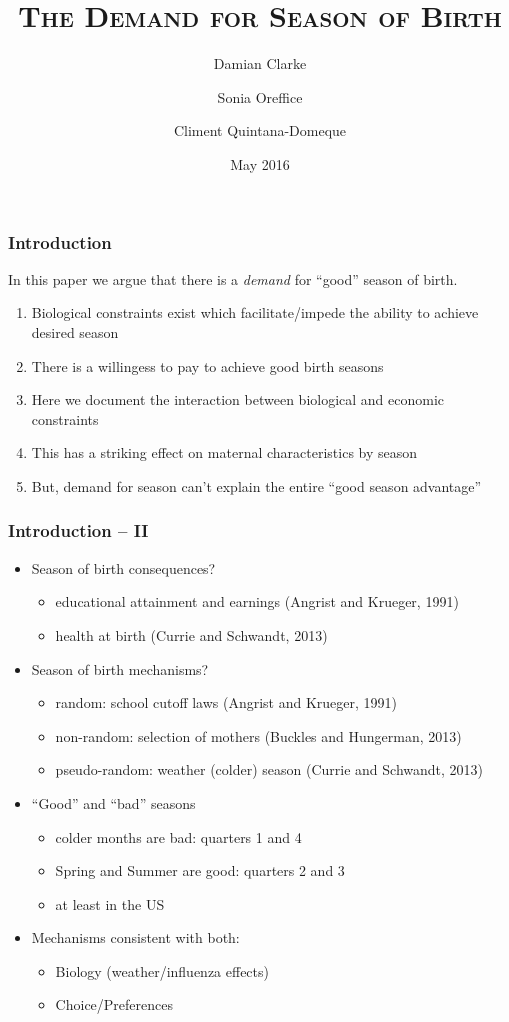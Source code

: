 \documentclass[10pt,letterpaper,subeqn]{beamer}
\title{\Large{\textsc{The Demand for Season of Birth}}}
\author{Damian Clarke\inst{\S}
   \and Sonia Oreffice\inst{\diamond}
   \and Climent Quintana-Domeque\inst{*}}
\institute{\inst{\S}  Universidad de Santiago de Chile
      \and \inst{\diamond} University of Surrey and IZA
      \and \inst{*}     University of Oxford and IZA}
\date{May 2016}
\begin{document}
\begin{frame}
\titlepage
\end{frame}
\begin{frame}
\frametitle{Introduction}
In this paper we argue that there is a \emph{demand} for ``good'' season of
birth.
\\
\vspace{5mm}
\begin{enumerate}
\item Biological constraints exist which facilitate/impede the ability to achieve
  desired season
\item There is a willingess to pay to achieve good birth seasons
\item Here we document the interaction between biological and economic constraints
\item This has a striking effect on maternal characteristics by season
\item But, demand for season can't explain the entire ``good season advantage''
\end{enumerate}
\end{frame}


\begin{frame}
\frametitle{Introduction -- II}
\begin{itemize}
\item Season of birth consequences?
\begin{itemize}
\item educational attainment and earnings (Angrist and Krueger, 1991)
\item health at birth (Currie and Schwandt, 2013)
\end{itemize}
\item Season of birth mechanisms?
\begin{itemize}
\item random: school cutoff laws (Angrist and Krueger, 1991)
\item non-random: selection of mothers (Buckles and Hungerman, 2013)
\item pseudo-random: weather (colder) season (Currie and Schwandt, 2013)
\end{itemize}
\item ``Good'' and ``bad'' seasons
\begin{itemize}
\item colder months are bad: quarters 1 and 4
\item Spring and Summer are good: quarters 2 and 3
\item at least in the US
\end{itemize}
\item Mechanisms consistent with both: 
\begin{itemize}
\item Biology (weather/influenza effects)
\item Choice/Preferences 
\end{itemize}
\end{itemize}
\end{frame}
\end{document}

